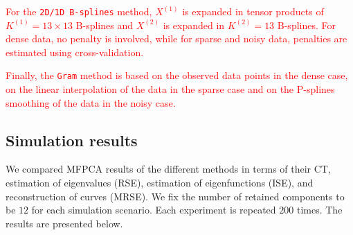 \textcolor{red}{For the \texttt{2D/1D B-splines} method, $X^{(1)}$ is expanded in tensor products of $K^{(1)} = 13 \times 13$ B-splines and $X^{(2)}$ is expanded in $K^{(2)} = 13$ B-splines. For dense data, no penalty is involved, while for sparse and noisy data, penalties are estimated using cross-validation.}

\textcolor{red}{Finally, the \texttt{Gram} method is based on the observed data points in the dense case, on the linear interpolation of the data in the sparse case \citep{benkoCommonFunctionalPrincipal2009} and on the P-splines smoothing of the data in the noisy case.}



\subsection{Simulation results} %
\label{sub:simulation_results}

We compared MFPCA results of the different methods in terms of their CT, estimation of eigenvalues (RSE), estimation of eigenfunctions (ISE), and reconstruction of curves (MRSE). We fix the number of retained components to be $12$ for each simulation scenario. Each experiment is repeated $200$ times. The results are presented below.

